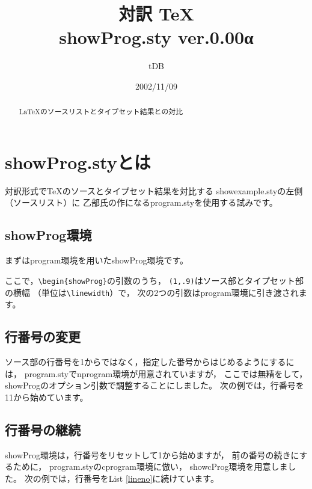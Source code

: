 \documentclass{jarticle}
\begin{document}
\title{対訳 \TeX\\
showProg.sty {\normalsize ver.0.00α}}
\author{tDB}
\date{2002/11/09}

\maketitle\thispagestyle{empty}
\begin{abstract}%
\begin{center}
\LaTeX のソースリストとタイプセット結果との対比
\end{center}
\end{abstract}
\pagebreak
{}%

\tableofcontents

\pagebreak
{}
\section{\textsf{showProg.sty}とは}
対訳形式で\TeX のソースとタイプセット結果を対比する
\textsf{showexample.sty}の左側（ソースリスト）に
乙部氏の作になる\textsf{program.sty}を使用する試みです。

\subsection{\textsf{showProg}環境}
まずは\textsf{program}環境を用いた\textsf{showProg}環境です。


ここで，\verb+\begin{showProg}+の引数のうち，
\verb+(1,.9)+はソース部とタイプセット部の横幅
（単位は\verb+\linewidth+）で，
次の2つの引数は\textsf{program}環境に引き渡されます。
\clearpage

\subsection{行番号の変更}
ソース部の行番号を1からではなく，指定した番号からはじめるようにするには，
\textsf{program.sty}で\textsf{nprogram}環境が用意されていますが，
ここでは無精をして，\textsf{showProg}のオプション引数で調整することにしました。
次の例では，行番号を11から始めています。

\clearpage

\subsection{行番号の継続}
\textsf{showProg}環境は，行番号をリセットして1から始めますが，
前の番号の続きにするために，
\textsf{program.sty}の\textsf{cprogram}環境に倣い，
\textsf{showcProg}環境を用意しました。
次の例では，行番号をList \ref{lineno}に続けています。
\end{document}
